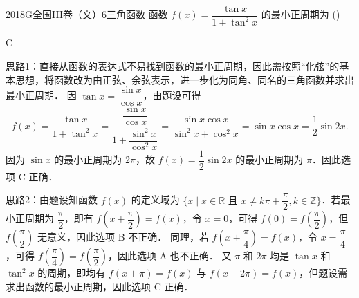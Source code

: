 
\begin{problem}{2018}{G}{全国III卷（文）}{6}{三角函数}
函数 $ f(x)=\dfrac{\tan x}{1+\tan^2x} $ 的最小正周期为 (\hspace{1cm})
\begin{choices}
\choice{{$\pi$}}
\choice{{$2\pi$}}
\end{choices}
\end{problem}

\begin{answer}
C
\end{answer}

\begin{solutions}
 思路1：直接从函数的表达式不易找到函数的最小正周期，因此需按照“化弦”的基本思想，将函数改为由正弦、余弦表示，进一步化为同角、同名的三角函数并求出最小正周期．  
因 $ \tan x=\dfrac{\sin x}{\cos x} $，由题设可得  
$$
f(x)=\dfrac{\tan x}{1+\tan^2x}=\dfrac{\dfrac{\sin x}{\cos x}}{1+\dfrac{\sin^2x}{\cos^2x}}=\dfrac{\sin x\cos x}{\sin^2x+\cos^2x}=\sin x\cos x=\dfrac{1}{2}\sin 2x.
$$  
因为 $ \sin x $ 的最小正周期为 $ 2\pi $，故 $ f(x)=\dfrac{1}{2}\sin 2x $ 的最小正周期为 $ \pi $．因此选项 C 正确．  

思路2：由题设知函数 $ f(x) $ 的定义域为 $ \{x\mid x\in\mathbb{R} \text{ 且 } x\ne k\pi+\dfrac{\pi}{2},k\in\mathbb{Z}\} $．若最小正周期为 $ \dfrac{\pi}{2} $，即有 $ f(x+\dfrac{\pi}{2})=f(x) $，令 $ x=0 $，可得 $ f(0)=f(\dfrac{\pi}{2}) $，但 $ f(\dfrac{\pi}{2}) $ 无意义，因此选项 B 不正确．  
同理，若 $ f(x+\dfrac{\pi}{4})=f(x) $，令 $ x=\dfrac{\pi}{4} $，可得 $ f(\dfrac{\pi}{4})=f(\dfrac{\pi}{2}) $，因此选项 A 也不正确．  
又 $ \pi $ 和 $ 2\pi $ 均是 $ \tan x $ 和 $ \tan^2x $ 的周期，即均有 $ f(x+\pi)=f(x) $ 与 $ f(x+2\pi)=f(x) $，但题设需求出函数的最小正周期，因此选项 C 正确．
\end{solutions}